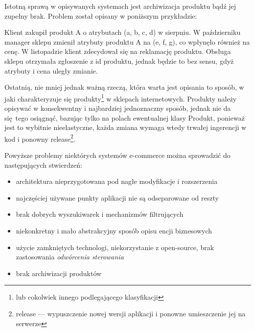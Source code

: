 Istotną sprawą w opisywanych systemach jest archiwizacja produktu bądź jej zupełny brak. Problem został opisany w poniższym przykładzie:
\begin{example}
	Klient zakupił produkt A o atrybutach (a, b, c, d) w sierpniu. W październiku manager sklepu zmienił atrybuty produktu A na (e, f, g), co wpłynęło również na cenę. W listopadzie klient zdecydował się na reklamację produktu. Obsługa sklepu otrzymała zgłoszenie z id produktu, jednak będzie to bez sensu, gdyż atrybuty i cena uległy zmianie. 
\end{example}

Ostatnią, nie mniej jednak ważną rzeczą, która warta jest opisania to sposób, w jaki charakteryzuje się produkty\footnote{ lub cokolwiek innego podlegającego klasyfikacji} w sklepach internetowych. Produkty należy opisywać w konsekwentny i najbardziej jednoznaczny sposób, jednak nie da się tego osiągnąć, bazując tylko na polach ewentualnej klasy Produkt, ponieważ jest to wybitnie nieelastyczne, każda zmiana wymaga wtedy trwałej ingerencji w kod i ponowny release\footnote{release — wypuszczenie nowej wersji aplikacji i ponowne umieszczenie jej na serwerze}.

Powyższe problemy niektórych systemów e-commerce można sprowadzić do następujących stwierdzeń:
\begin{itemize}
	\item architektura nieprzygotowana pod nagłe modyfikacje i rozszerzenia
	\item najczęściej używane punkty aplikacji nie są odseparowane od reszty
	\item brak dobrych wyszukiwarek i mechanizmów filtrujących
	\item niekonkretny i mało abstrakcyjny sposób opisu encji biznesowych
	\item użycie zamkniętych technologi, niekorzystanie z open-source, brak zastosowania \textit{odwórcenia sterowania}
	\item brak archiwizacji produktów
\end{itemize}

